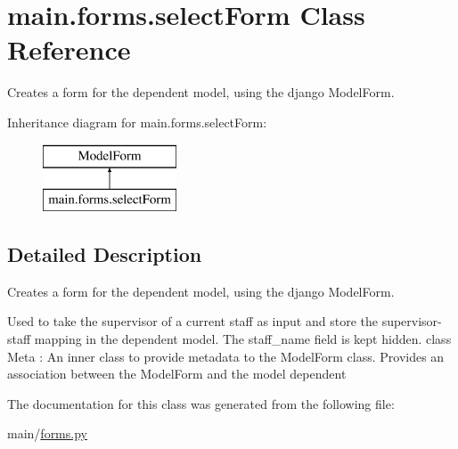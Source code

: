 \hypertarget{classmain_1_1forms_1_1selectForm}{}\section{main.\+forms.\+select\+Form Class Reference}
\label{classmain_1_1forms_1_1selectForm}


Creates a form for the dependent model, using the django Model\+Form.  


Inheritance diagram for main.\+forms.\+select\+Form\+:\begin{figure}[H]
\begin{center}
\leavevmode
\includegraphics[height=2.000000cm]{classmain_1_1forms_1_1selectForm}
\end{center}
\end{figure}


\subsection{Detailed Description}
Creates a form for the dependent model, using the django Model\+Form. 

Used to take the supervisor of a current staff as input and store the supervisor-\/staff mapping in the dependent model. The staff\+\_\+name field is kept hidden. class Meta \+: An inner class to provide metadata to the Model\+Form class. Provides an association between the Model\+Form and the model dependent 

The documentation for this class was generated from the following file\+:\begin{DoxyCompactItemize}
\item 
main/\hyperlink{forms_8py}{forms.\+py}\end{DoxyCompactItemize}
